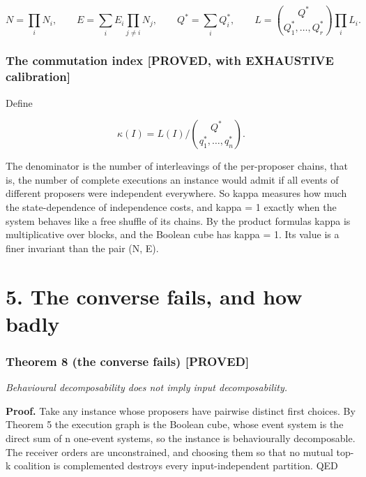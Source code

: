 \documentclass[
  11pt,
]{article}
\begin{document}
\[
N=\prod_i N_i,\qquad E=\sum_i E_i\prod_{j\neq i}N_j,\qquad Q^{*}=\sum_i Q_i^{*},\qquad L=\binom{Q^{*}}{Q_1^{*},\dots ,Q_r^{*}}\prod_i L_i .
\]

\hypertarget{the-commutation-index-proved-with-exhaustive-calibration}{%
\subsubsection{The commutation index {[}PROVED, with EXHAUSTIVE
calibration{]}}\label{the-commutation-index-proved-with-exhaustive-calibration}}

Define

\[
\kappa(I)=L(I)\Big/\binom{Q^{*}}{q^{*}_1,\dots ,q^{*}_n}.
\]

The denominator is the number of interleavings of the per-proposer
chains, that is, the number of complete executions an instance would
admit if all events of different proposers were independent everywhere.
So kappa measures how much the state-dependence of independence costs,
and kappa = 1 exactly when the system behaves like a free shuffle of its
chains. By the product formulas kappa is multiplicative over blocks, and
the Boolean cube has kappa = 1. Its value is a finer invariant than the
pair (N, E).

\clearpage


\hypertarget{the-converse-fails-and-how-badly}{%
\section{5. The converse fails, and how
badly}\label{the-converse-fails-and-how-badly}}

\hypertarget{theorem-8-the-converse-fails-proved}{%
\subsubsection{Theorem 8 (the converse fails)
{[}PROVED{]}}\label{theorem-8-the-converse-fails-proved}}

\emph{Behavioural decomposability does not imply input decomposability.}

\textbf{Proof.} Take any instance whose proposers have pairwise distinct
first choices. By Theorem 5 the execution graph is the Boolean cube,
whose event system is the direct sum of n one-event systems, so the
instance is behaviourally decomposable. The receiver orders are
unconstrained, and choosing them so that no mutual top-k coalition is
complemented destroys every input-independent partition. QED
\end{document}
